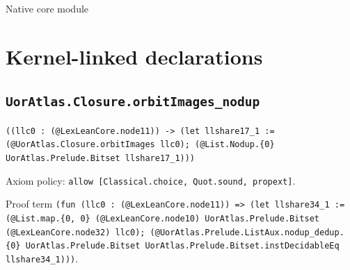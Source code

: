 \documentclass[11pt]{article}
\begin{document}
\begin{center}{\LARGE Native core module}\end{center}
\section*{Kernel-linked declarations}
\subsection*{\texttt{UorAtlas.Closure.orbitImages\_nodup}}
\noindent\texttt{((llc0 : (@LexLeanCore.node11)) -> (let llshare17\_1 := (@UorAtlas.Closure.orbitImages llc0); (@List.Nodup.\{0\} UorAtlas.Prelude.Bitset llshare17\_1)))}\par
\noindent Axiom policy: \texttt{allow [Classical.choice, Quot.sound, propext]}.\par
\noindent Proof term \texttt{(fun (llc0 : (@LexLeanCore.node11)) => (let llshare34\_1 := (@List.map.\{0, 0\} (@LexLeanCore.node10) UorAtlas.Prelude.Bitset (@LexLeanCore.node32) llc0); (@UorAtlas.Prelude.ListAux.nodup\_dedup.\{0\} UorAtlas.Prelude.Bitset UorAtlas.Prelude.Bitset.instDecidableEq llshare34\_1)))}.\par
\end{document}
